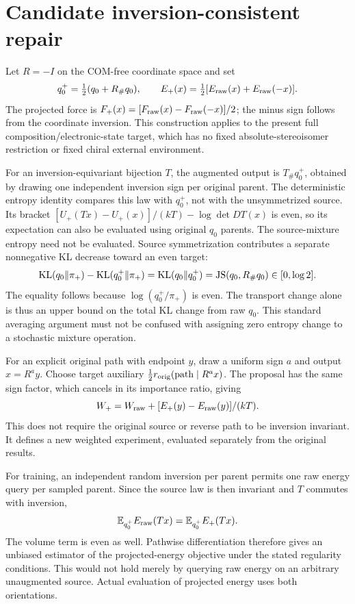 \section{Candidate inversion-consistent repair}
\label{app:parity-repair}
Let $R=-I$ on the COM-free coordinate space and set
\[
 q_0^+=\tfrac12(q_0+R_\#q_0),\qquad
 E_+(x)=\tfrac12[E_{\rm raw}(x)+E_{\rm raw}(-x)].
\]
The projected force is
$F_+(x)=[F_{\rm raw}(x)-F_{\rm raw}(-x)]/2$; the minus sign follows from
the coordinate inversion. This construction applies to the present full
composition/electronic-state target, which has no fixed absolute-stereoisomer
restriction or fixed chiral external environment.

For an inversion-equivariant bijection $T$, the augmented output is
$T_\#q_0^+$, obtained by drawing one independent inversion sign per original
parent. The deterministic entropy identity compares this law with $q_0^+$,
not with the unsymmetrized source. Its bracket
$[U_+(Tx)-U_+(x)]/(kT)-\log\det DT(x)$ is even, so its expectation can also
be evaluated using original $q_0$ parents. The source-mixture entropy need
not be evaluated. Source symmetrization contributes a separate nonnegative
KL decrease toward an even target:
\[
 \operatorname{KL}(q_0\Vert\pi_+)-\operatorname{KL}(q_0^+\Vert\pi_+)
 =\operatorname{KL}(q_0\Vert q_0^+)=\mathrm{JS}(q_0,R_\#q_0)\in[0,\log2].
\]
The equality follows because $\log(q_0^+/\pi_+)$ is even. The transport
change alone is thus an upper bound on the total KL change from raw $q_0$.
This standard averaging argument must not be confused with assigning zero
entropy change to a stochastic mixture operation.

For an explicit original path with endpoint $y$, draw a uniform sign $a$ and
output $x=R^a y$. Choose target auxiliary
$\tfrac12 r_{\rm orig}(\mathrm{path}\mid R^a x)$. The proposal has the same
sign factor, which cancels in its importance ratio, giving
\[
 W_+=W_{\rm raw}+[E_+(y)-E_{\rm raw}(y)]/(kT).
\]
This does not require the original source or reverse path to be inversion
invariant. It defines a new weighted experiment, evaluated separately from
the original results.

For training, an independent random inversion per parent permits one raw energy
query per sampled parent. Since the source law is then invariant and $T$
commutes with inversion,
\[
 \mathbb E_{q_0^+}E_{\rm raw}(Tx)=\mathbb E_{q_0^+}E_+(Tx).
\]
The volume term is even as well. Pathwise differentiation therefore gives an
unbiased estimator of the projected-energy objective under the stated regularity
conditions. This would not hold merely by querying raw energy on an arbitrary
unaugmented source. Actual evaluation of projected energy uses both orientations.

